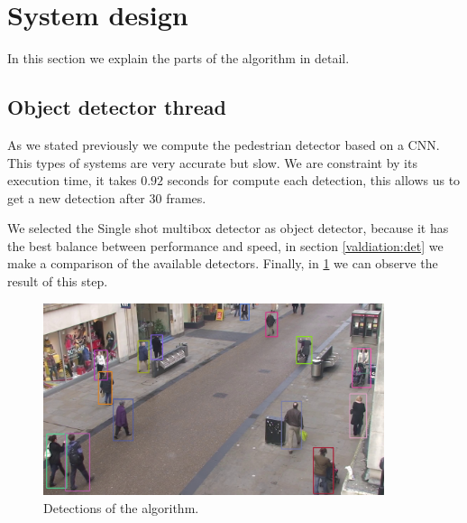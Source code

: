 \section{System design}

In this section we explain the parts of the algorithm in detail.

\subsection{Object detector thread}



As we stated previously we compute the pedestrian detector based on a CNN. This types of systems are very accurate but slow. We are constraint by its execution time, it takes $0.92$ seconds for compute each detection, this allows us to get a new detection after $30$ frames. 


We selected the Single shot multibox detector as object detector, because it has the best balance between performance and speed, in section \ref{valdiation:det} we make a comparison of the available detectors. Finally, in \ref{objectDetector1} we can observe the result of this step.


\begin{figure}[H]
\centering         
\includegraphics[width=10cm]{intro/deteccions.jpg}
\caption{Detections of the algorithm.} \label{objectDetector1}
\end{figure}


